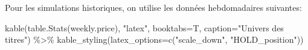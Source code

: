 \documentclass[
]{article}
\newenvironment{Shaded}{\begin{snugshade}}{\end{snugshade}}
\newcommand{\AttributeTok}[1]{\textcolor[rgb]{0.77,0.63,0.00}{#1}}
\newcommand{\FunctionTok}[1]{\textcolor[rgb]{0.00,0.00,0.00}{#1}}
\newcommand{\NormalTok}[1]{#1}
\newcommand{\SpecialCharTok}[1]{\textcolor[rgb]{0.00,0.00,0.00}{#1}}
\newcommand{\StringTok}[1]{\textcolor[rgb]{0.31,0.60,0.02}{#1}}
\begin{document}
Pour les simulations historiques, on utilise les données hebdomadaires
suivantes:

\begin{Shaded}
\begin{Highlighting}[]
\FunctionTok{kable}\NormalTok{(}\FunctionTok{table.Stats}\NormalTok{(weekly.price), }\StringTok{"latex"}\NormalTok{, }\AttributeTok{booktabs=}\NormalTok{T, }\AttributeTok{caption=}\StringTok{"Univers des titres"}\NormalTok{) }\SpecialCharTok{\%\textgreater{}\%} 
  \FunctionTok{kable\_styling}\NormalTok{(}\AttributeTok{latex\_options=}\FunctionTok{c}\NormalTok{(}\StringTok{"scale\_down"}\NormalTok{, }\StringTok{"HOLD\_position"}\NormalTok{))}
\end{Highlighting}
\end{Shaded}

\begin{table}[H]


\end{table}
\end{document}
